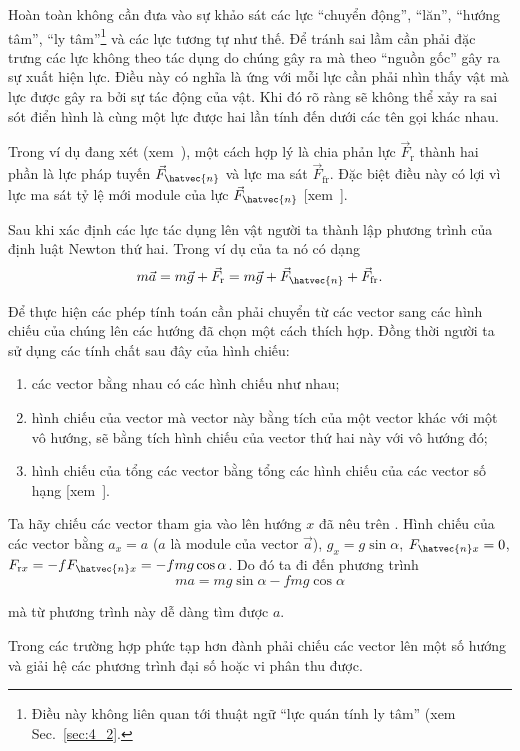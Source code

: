 Hoàn toàn không cần đưa vào sự khảo sát các lực ``chuyển động'', ``lăn'', ``hướng tâm'', ``ly tâm''\footnote{Điều này không liên quan tới thuật ngữ ``lực quán tính ly tâm'' (xem Sec.~\ref{sec:4_2}.} và các lực tương tự như thế. Để tránh sai lầm cần phải đặc trưng các lực không theo tác dụng do chúng gây ra mà theo ``nguồn gốc'' gây ra sự xuất hiện lực. Điều này có nghĩa là ứng với mỗi lực cần phải nhìn thấy vật mà lực được gây ra bởi sự tác động của vật. Khi đó rõ ràng sẽ không thể xảy ra sai sót điển hình là cùng một lực được hai lần tính đến dưới các tên gọi khác nhau.

Trong ví dụ đang xét (xem~), một cách hợp lý là chia phản lực $\vec{F}_{\text{r}}$ thành hai phần là lực pháp tuyến $\vec{F}_{\hatvec{n}}$ và lực ma sát $\vec{F}_{\text{fr}}$. Đặc biệt điều này có lợi vì lực ma sát tỷ lệ mới module của lực $\vec{F}_{\hatvec{n}}$ [xem~].

Sau khi xác định các lực tác dụng lên vật người ta thành lập phương trình của định luật Newton thứ hai. Trong ví dụ của ta nó có dạng
\begin{equation}\label{eq:2_42}
m\vec{a} = m\vec{g} + \vec{F}_{\text{r}} = m\vec{g} + \vec{F}_{\hatvec{n}} + \vec{F}_{\text{fr}}.
\end{equation}

\noindent
Để thực hiện các phép tính toán cần phải chuyển từ các vector sang các hình chiếu của chúng lên các hướng đã chọn một cách thích hợp. Đồng thời người ta sử dụng các tính chất sau đây của hình chiếu:
\begin{enumerate}[(1)]
	\item các vector bằng nhau có các hình chiếu như nhau;
	\item hình chiếu của vector mà vector này bằng tích của một vector khác với một vô hướng, sẽ bằng tích hình chiếu của vector thứ hai này với vô hướng đó;
	\item hình chiếu của tổng các vector bằng tổng các hình chiếu của các vector số hạng [xem~].
\end{enumerate}

Ta hãy chiếu các vector tham gia vào  lên hướng $x$ đã nêu trên . Hình chiếu của các vector bằng $a_x=a$ ($a$ là module của vector $\vec{a}$), $g_x=g\sin\alpha$, $F_{\hatvec{n}x}=0$, $F_{\text{r}x}=-f F_{\hatvec{n}x}=-fmg\cos\alpha$. Do đó ta đi đến phương trình
\begin{equation*}
ma = mg\sin\alpha - fmg\cos\alpha
\end{equation*}

\noindent
mà từ phương trình này dễ dàng tìm được $a$.

Trong các trường hợp phức tạp hơn đành phải chiếu các vector lên một số hướng và giải hệ các phương trình đại số hoặc vi phân thu được.
